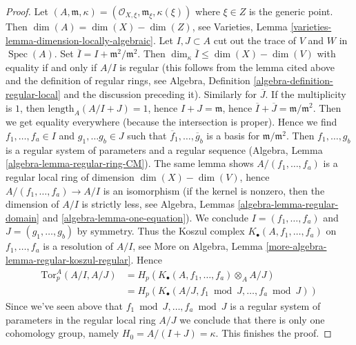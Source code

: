 \documentclass{stacks-project}
\theoremstyle{plain}
\theoremstyle{definition}
\theoremstyle{remark}
\numberwithin{equation}{subsection}
\def\Spec{\mathop{\mathrm{Spec}}}
\begin{document}
\begin{proof}
Let $(A, \mathfrak m, \kappa) =
(\mathcal{O}_{X, \xi}, \mathfrak m_\xi, \kappa(\xi))$ where $\xi \in Z$
is the generic point. Then $\dim(A) = \dim(X) - \dim(Z)$, see
Varieties, Lemma \ref{varieties-lemma-dimension-locally-algebraic}.
Let $I, J \subset A$ cut out the trace of $V$ and $W$
in $\Spec(A)$. Set $\overline{I} = I + \mathfrak m^2/\mathfrak m^2$.
Then $\dim_\kappa \overline{I} \leq \dim(X) - \dim(V)$ with equality
if and only if $A/I$ is regular (this follows from the lemma cited
above and the definition of regular rings, see
Algebra, Definition \ref{algebra-definition-regular-local}
and the discussion preceding it). Similarly for $\overline{J}$.
If the multiplicity is $1$, then
$\text{length}_A(A/I + J) = 1$, hence $I + J = \mathfrak m$, hence
$\overline{I} + \overline{J} = \mathfrak m/\mathfrak m^2$.
Then we get equality everywhere (because the intersection is
proper). Hence we find $f_1, \ldots, f_a \in I$ and $g_1, \ldots g_b \in J$
such that $\overline{f}_1, \ldots, \overline{g}_b$ is a basis
for $\mathfrak m/\mathfrak m^2$. Then $f_1, \ldots, g_b$ is a
regular system of parameters and a regular sequence
(Algebra, Lemma \ref{algebra-lemma-regular-ring-CM}).
The same lemma shows $A/(f_1, \ldots, f_a)$ is a regular local ring
of dimension $\dim(X) - \dim(V)$, hence $A/(f_1, \ldots, f_a) \to A/I$
is an isomorphism (if the kernel is nonzero, then the dimension
of $A/I$ is strictly less, see
Algebra, Lemmas \ref{algebra-lemma-regular-domain} and
\ref{algebra-lemma-one-equation}).
We conclude $I = (f_1, \ldots, f_a)$ and $J = (g_1, \ldots, g_b)$
by symmetry. Thus the Koszul complex $K_\bullet(A, f_1, \ldots, f_a)$
on $f_1, \ldots, f_a$ is a resolution of $A/I$, see
More on Algebra, Lemma \ref{more-algebra-lemma-regular-koszul-regular}.
Hence
\begin{align*}
\text{Tor}_p^A(A/I, A/J)
& =
H_p(K_\bullet(A, f_1, \ldots, f_a) \otimes_A A/J) \\
& =
H_p(K_\bullet(A/J, f_1 \bmod J, \ldots, f_a \bmod J))
\end{align*}
Since we've seen above that $f_1 \bmod J, \ldots, f_a \bmod J$ is
a regular system of parameters in the regular local ring $A/J$
we conclude that there is only one cohomology group, namely
$H_0 = A/(I + J) = \kappa$. This finishes the proof.
\end{proof}
\end{document}
